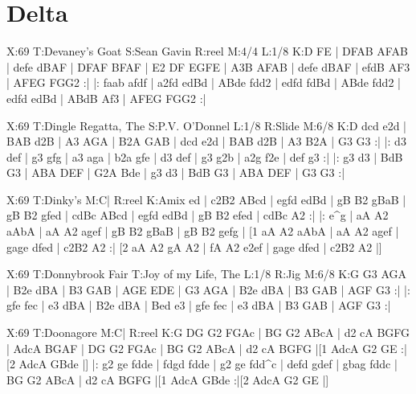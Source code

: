 \documentclass{article}
\begin{document}
\section{Delta}

\begin{abc}[name]
X:69
T:Devaney's Goat
S:Sean Gavin
R:reel
M:4/4
L:1/8
K:D
FE | DFAB AFAB | defe dBAF | DFAF BFAF | E2 DF EGFE |
A3B AFAB | defe dBAF | efdB AF3 | AFEG FGG2 :|
|: faab afdf | a2fd edBd | ABde fdd2 | edfd fdBd |
ABde fdd2 | edfd edBd | ABdB Af3 | AFEG FGG2 :|
\end{abc}

\begin{abc}[name]
X:69
T:Dingle Regatta, The
S:P.V. O'Donnel
L:1/8
R:Slide
M:6/8
K:D
dcd e2d | BAB d2B | A3 AGA | B2A GAB |
dcd e2d | BAB d2B | A3 B2A | G3 G3 :|
|: d3 def | g3 gfg | a3 aga | b2a gfe |
d3 def | g3 g2b | a2g f2e | def g3 :|
|: g3 d3 | BdB G3 | ABA DEF | G2A Bde |
g3 d3 | BdB G3 | ABA DEF | G3 G3 :|
\end{abc}

\begin{abc}[name]
X:69
T:Dinky's
M:C|
R:reel
K:Amix
ed | c2B2 ABcd | egfd edBd | gB B2 gBaB | gB B2 gfed |
cdBc ABcd | egfd edBd | gB B2 efed | cdBc A2 :|
|: e^g | aA A2 aAbA | aA A2 agef | gB B2 gBaB | gB B2 gefg |
[1 aA A2 aAbA | aA A2 agef | gage dfed | c2B2 A2 :|
[2 aA A2 gA A2 | fA A2 e2ef | gage dfed | c2B2 A2 |]
\end{abc}

\begin{abc}[name]
X:69
T:Donnybrook Fair
T:Joy of my Life, The
L:1/8
R:Jig
M:6/8
K:G
G3 AGA | B2e dBA | B3 GAB | AGE EDE |
G3 AGA | B2e dBA | B3 GAB | AGF G3 :|
|: gfe fec | e3 dBA | B2e dBA | Bed e3 |
gfe fec | e3 dBA | B3 GAB | AGF G3 :|
\end{abc}

\begin{abc}[name]
X:69
T:Doonagore
M:C|
R:reel
K:G
DG G2 FGAc | BG G2 ABcA | d2 cA BGFG | AdcA BGAF |
DG G2 FGAc | BG G2 ABcA | d2 cA BGFG |[1 AdcA G2 GE :|[2 AdcA GBde |]
|: g2 ge fdde | fdgd fdde | g2 ge fdd^c | defd gdef |
gbag fddc | BG G2 ABcA | d2 cA BGFG |[1 AdcA GBde :|[2 AdcA G2 GE |]
\end{abc}
\end{document}
